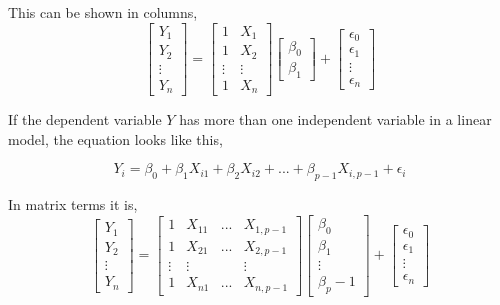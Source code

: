 	This can be shown in columns,
	$$
	\left[
	\begin{array}{c}
		Y_1 \\ 
		Y_2 \\ 
		\vdots \\
		Y_n 
	\end{array}
	\right]
	=
	\left[
	\begin{array}{cc}
		1 & X_1 \\ 
		1 & X_2 \\ 
		\vdots & \vdots \\
		1 & X_n
	\end{array}
	\right]
	\left[
	\begin{array}{c}
		\beta_0 \\ 
		\beta_1 
	\end{array}
	\right]
	+
	\left[
	\begin{array}{c}
		\epsilon_0 \\ 
		\epsilon_1 \\
		\vdots \\
		\epsilon_n 
	\end{array}
	\right]
	$$
	
	If the dependent variable $Y$ has more than one independent variable in a linear model, the equation looks like this, 
	
	$$Y_i = \beta_0 + \beta_1 X_{i1} + \beta_2 X_{i2} + ... + \beta_{p-1} X_{i, p-1} + \epsilon_i$$
	
	In matrix terms it is,  
	$$
	\left[
	\begin{array}{c}
		Y_1 \\ 
		Y_2 \\ 
		\vdots \\
		Y_n 
	\end{array}
	\right]
	=
	\left[
	\begin{array}{cccc}
		1 & X_{11} & ... & X_{1, p-1} \\ 
		1 & X_{21} & ... & X_{2, p-1} \\ 
		\vdots & \vdots &  & \vdots \\
		1 & X_{n1} & ... & X_{n, p-1}
	\end{array}
	\right]
	\left[
	\begin{array}{c}
		\beta_0 \\ 
		\beta_1 \\
		\vdots \\
		\beta_p-1 
	\end{array}
	\right]
	+
	\left[
	\begin{array}{c}
		\epsilon_0 \\ 
		\epsilon_1 \\
		\vdots \\
		\epsilon_n 
	\end{array}
	\right]
	$$
	
